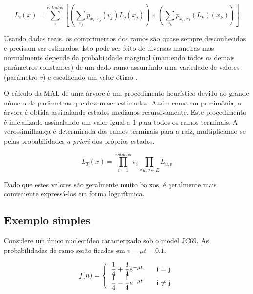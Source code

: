 \begin{refsection}
\begin{center}
\begin{equation}
L_{i}(x) = \sum_{i}^{estados} \left[\left(\sum_{x_j}p_{x_i,x_j}(v_j)L_j(x_j)\right) \times \left(\sum_{x_k}p_{x_i,x_k}(L_k)(x_k)\right)\right]
\end{equation}
\end{center}

Usando dados reais, os comprimentos dos ramos são quase sempre desconhecidos e precisam ser estimados. Isto pode ser feito de diversas maneiras mas normalmente depende da probabilidade marginal (mantendo todos os demais parâmetros constantes) de um dado ramo assumindo uma variedade de valores (parâmetro $v$) e escolhendo um valor ótimo \parencite[para mais detalhes, veja ][, Capítulo 11]{Wheeler2012}.

O cálculo da MAL de uma árvore é um procedimento heurístico devido ao grande número de parâmetros que devem ser estimados. Assim como em parcimônia, a árvore é obtida assinalando estados medianos recursivamente. Este procedimento é inicializado assinalando um valor igual a 1 para todos os ramos terminais. A verossimilhança é determinada dos ramos terminais para a raiz, multiplicando-se pelas probabilidades \textit{a priori} dos próprios estados.

\begin{center}
\begin{equation}
L_{T}(x) = \prod_{i=1}^{estados} \pi_{i} \prod_{\forall u,v \in E} L_{u,v}
\end{equation}
\end{center}

Dado que estes valores são geralmente muito baixos, é geralmente mais conveniente expressá-los em forma logarítmica.

\subsection{Exemplo simples}

Considere um único nucleotídeo caracterizado sob o model JC69. As probabilidades de ramo serão ficadas em $v = \mu t=0.1$.

\begin{center}
\begin{equation}
f(n) = \left\{
  \begin{array}{l l}
    \dfrac{1}{4} + \dfrac{3}{4}e^{-\mu t} & \quad \text{i $=$ j}\\
    \dfrac{1}{4} - \dfrac{1}{4}e^{-\mu t} & \quad \text{i $\neq$ j}
  \end{array} \right.
\end{equation}
\end{center}


\end{refsection}
